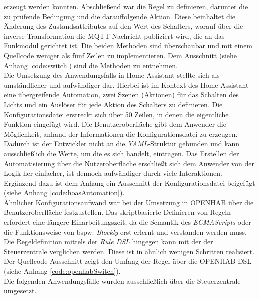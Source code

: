     erzeugt werden konnten. Abschließend war die Regel zu definieren, darunter die zu prüfende Bedingung und die darauffolgende Aktion. Diese beinhaltet die Änderung des Zustandsattributes auf den Wert 
    des Schalters, worauf über die inverse Transformation die \acs{MQTT}-Nachricht publiziert wird, die an das Funkmodul gerichtet ist. 
    Die beiden Methoden sind überschaubar und mit einem Quellcode weniger als fünf Zeilen zu implementieren. Dem Ausschnitt (siehe Anhang \ref{code:switch}) 
    sind die Methoden zu entnehmen. 
    \\
    Die Umsetzung des Anwendungsfalls in Home Assistant stellte sich als umständlicher und aufwändiger dar. Hierbei ist im Kontext des Home Assistant 
    eine übergreifende Automation, zwei Szenen (Aktionen) für das Schalten des Lichts und ein Auslöser für jede Aktion des Schalters zu definieren. Die Konfigurationsdatei 
    erstreckt sich über 50 Zeilen, in denen die eigentliche Funktion eingefügt wird. Die Benutzeroberfläche gibt dem Anwender die Möglichkeit, anhand der Informationen die 
    Konfigurationsdatei zu erzeugen. Dadurch ist der Entwickler nicht an die \textit{YAML}-Struktur gebunden und kann ausschließlich die Werte, um die es sich handelt, eintragen. 
    Das Erstellen der Automatisierung über die Nutzeroberfläche erschließt sich dem Anwender von der Logik her einfacher, ist dennoch 
    aufwändiger durch viele Interaktionen. Ergänzend dazu ist dem Anhang ein Ausschnitt der Konfigurationsdatei beigefügt (siehe Anhang \ref{code:hoasAutomation}).
    \\
    \linebreak
    Ähnlicher Konfigurationsaufwand war bei der Umsetzung in \acs{OPENHAB} über die Benutzeroberfläche festzustellen. Das skriptbasierte Definieren von Regeln erfordert eine 
    längere Einarbeitungszeit, da die Semantik des \textit{ECMAScripts} oder die Funktionsweise von bspw. \textit{Blockly} erst erlernt und verstanden werden muss. Die Regeldefinition 
    mittels der \textit{Rule \acs{DSL}} hingegen kann mit der der Steuerzentrale verglichen werden. Diese ist in ähnlich wenigen Schritten realisiert. Der 
    Quellcode-Ausschnitt zeigt den Umfang der Regel über die \acs{OPENHAB} \acs{DSL} (siehe Anhang \ref{code:openhabSwitch}). 
    \\
    \linebreak
    Die folgenden Anwendungsfälle wurden ausschließlich über die Steuerzentrale umgesetzt. 

